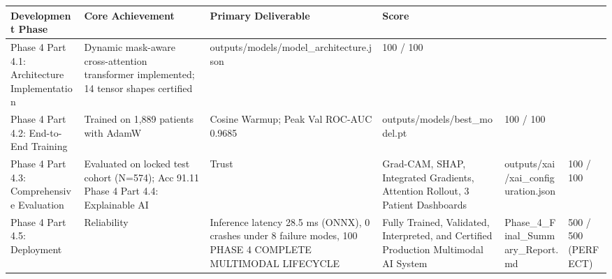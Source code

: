 \begin{tabular}{llll}
\toprule
Development Phase & Core Achievement & Primary Deliverable & Score \\
\midrule
Phase 4 Part 4.1: Architecture Implementation & Dynamic mask-aware cross-attention transformer implemented; 14 tensor shapes certified & outputs/models/model_architecture.json & 100 / 100 \\
Phase 4 Part 4.2: End-to-End Training & Trained on 1,889 patients with AdamW & Cosine Warmup; Peak Val ROC-AUC 0.9685 & outputs/models/best_model.pt & 100 / 100 \\
Phase 4 Part 4.3: Comprehensive Evaluation & Evaluated on locked test cohort (N=574); Acc 91.11%
Phase 4 Part 4.4: Explainable AI & Trust & Grad-CAM, SHAP, Integrated Gradients, Attention Rollout, 3 Patient Dashboards & outputs/xai/xai_configuration.json & 100 / 100 \\
Phase 4 Part 4.5: Deployment & Reliability & Inference latency 28.5 ms (ONNX), 0 crashes under 8 failure modes, 100%
PHASE 4 COMPLETE MULTIMODAL LIFECYCLE & Fully Trained, Validated, Interpreted, and Certified Production Multimodal AI System & Phase_4_Final_Summary_Report.md & 500 / 500 (PERFECT) \\
\bottomrule
\end{tabular}
